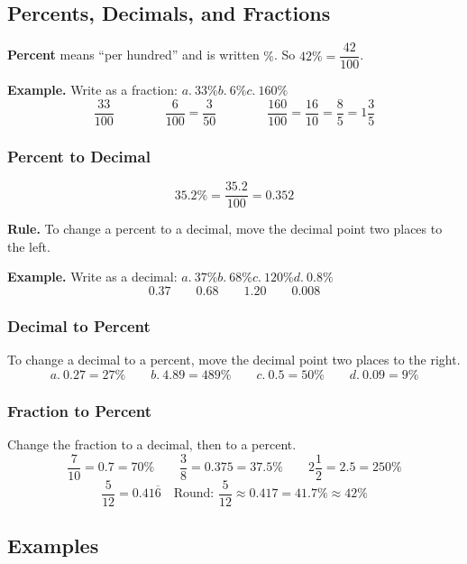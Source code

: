 \documentclass[letter]{article}
\newenvironment{keybox}
  {\begin{lrbox}{\keyboxsave}\begin{minipage}{\dimexpr\linewidth-2\fboxsep-2\fboxrule\relax}}
  {\end{minipage}\end{lrbox}\par\noindent\fbox{\usebox{\keyboxsave}}\par}
\begin{document}
\subsection{Percents, Decimals, and Fractions}

\begin{keybox}
\textbf{Percent} means ``per hundred'' and is written $\%$. So $42\%=\dfrac{42}{100}$.
\end{keybox}

\textbf{Example.} Write as a fraction: $a.\ 33\%$\quad $b.\ 6\%$\quad $c.\ 160\%$
\[\frac{33}{100}\qquad\qquad\frac6{100}=\frac3{50}\qquad\qquad\frac{160}{100}=\frac{16}{10}=\frac85=1\frac35\]

\subsubsection*{Percent to Decimal}
\[35.2\%=\frac{35.2}{100}=0.352\]

\begin{keybox}
\textbf{Rule.} To change a percent to a decimal, move the decimal point two places to the left.
\end{keybox}

\textbf{Example.} Write as a decimal: $a.\ 37\%$\quad $b.\ 68\%$\quad $c.\ 120\%$\quad $d.\ 0.8\%$
\[0.37\qquad0.68\qquad1.20\qquad0.008\]

\subsubsection*{Decimal to Percent}
To change a decimal to a percent, move the decimal point two places to the right.
\[a.\ 0.27=27\%\qquad b.\ 4.89=489\%\qquad c.\ 0.5=50\%\qquad d.\ 0.09=9\%\]

\subsubsection*{Fraction to Percent}
Change the fraction to a decimal, then to a percent.
\[\frac7{10}=0.7=70\%\qquad\frac38=0.375=37.5\%\qquad2\frac12=2.5=250\%\]
\[\frac5{12}=0.41\overline6\quad\text{Round: }\frac5{12}\approx0.417=41.7\%\approx42\%\]

\pagebreak
\subsection{Examples}
\end{document}
